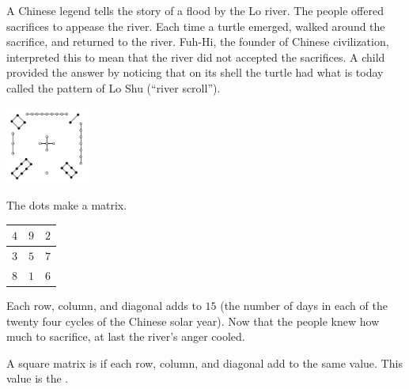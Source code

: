 A Chinese legend tells the story of a  
flood by the Lo river.
The people offered sacrifices to appease the river.
Each time a turtle emerged, 
walked around the sacrifice, and returned to the river.
Fuh-Hi, %
the founder of Chinese civilization,
interpreted this to mean that
the river did not accepted the sacrifices.  
A child provided the answer by noticing 
that on its shell the turtle had what is today
called the pattern of Lo Shu (``river scroll'').
\begin{center}
  \includegraphics[height=1in]{LoShu.png}
\end{center}
The dots make a matrix.
\begin{center}
  \begin{tabular}{|c|c|c|}
    \hline
      $4$  &$9$  &$2$  \\ \hline
      $3$  &$5$  &$7$  \\ \hline
      $8$  &$1$  &$6$  \\ \hline    
  \end{tabular}
\end{center}
Each row, column, 
and diagonal adds to $15$
(the number of days in each of the twenty four cycles of the 
Chinese solar year).
Now that the people knew how much to sacrifice, at last the river's anger cooled.

A square matrix is 
if each row, column, and diagonal add to the same
value.
This value is the .

